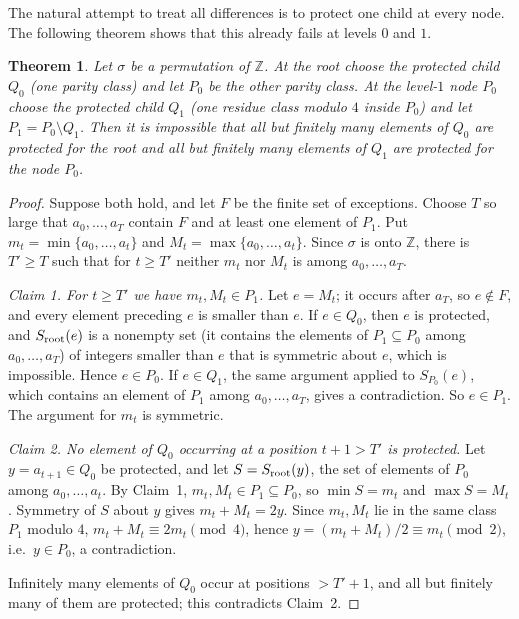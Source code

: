 \documentclass[11pt]{amsart}
\newtheorem{theorem}{Theorem}[section]
\theoremstyle{definition}
\theoremstyle{remark}
\newcommand{\Z}{\mathbb{Z}}
\begin{document}
The natural attempt to treat all differences is to protect one child at every node. The following theorem shows that this already fails at levels $0$ and $1$.

\begin{theorem}\label{thm:twolevel}
Let $\sigma$ be a permutation of $\Z$. At the root choose the protected child $Q_0$ (one parity class) and let $P_0$ be the other parity class. At the level-$1$ node $P_0$ choose the protected child $Q_1$ (one residue class modulo $4$ inside $P_0$) and let $P_1=P_0\setminus Q_1$. Then it is impossible that all but finitely many elements of $Q_0$ are protected for the root and all but finitely many elements of $Q_1$ are protected for the node $P_0$.
\end{theorem}

\begin{proof}
Suppose both hold, and let $F$ be the finite set of exceptions. Choose $T$ so large that $a_0,\dots,a_{T}$ contain $F$ and at least one element of $P_1$. Put $m_t=\min\{a_0,\dots,a_t\}$ and $M_t=\max\{a_0,\dots,a_t\}$. Since $\sigma$ is onto $\Z$, there is $T'\ge T$ such that for $t\ge T'$ neither $m_t$ nor $M_t$ is among $a_0,\dots,a_T$.

\emph{Claim 1. For $t\ge T'$ we have $m_t,M_t\in P_1$.} Let $e=M_t$; it occurs after $a_T$, so $e\notin F$, and every element preceding $e$ is smaller than $e$. If $e\in Q_0$, then $e$ is protected, and $S_{\rm root}(e)$ is a nonempty set (it contains the elements of $P_1\subseteq P_0$ among $a_0,\dots,a_T$) of integers smaller than $e$ that is symmetric about $e$, which is impossible. Hence $e\in P_0$. If $e\in Q_1$, the same argument applied to $S_{P_0}(e)$, which contains an element of $P_1$ among $a_0,\dots,a_T$, gives a contradiction. So $e\in P_1$. The argument for $m_t$ is symmetric.

\emph{Claim 2. No element of $Q_0$ occurring at a position $t+1>T'$ is protected.} Let $y=a_{t+1}\in Q_0$ be protected, and let $S=S_{\rm root}(y)$, the set of elements of $P_0$ among $a_0,\dots,a_t$. By Claim~1, $m_t,M_t\in P_1\subseteq P_0$, so $\min S=m_t$ and $\max S=M_t$. Symmetry of $S$ about $y$ gives $m_t+M_t=2y$. Since $m_t,M_t$ lie in the same class $P_1$ modulo $4$, $m_t+M_t\equiv 2m_t\pmod 4$, hence $y=(m_t+M_t)/2\equiv m_t\pmod 2$, i.e.\ $y\in P_0$, a contradiction.

Infinitely many elements of $Q_0$ occur at positions $>T'+1$, and all but finitely many of them are protected; this contradicts Claim~2.
\end{proof}
\end{document}
